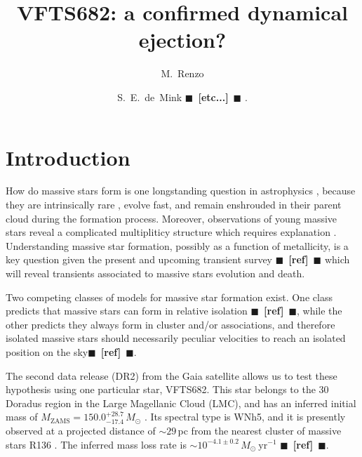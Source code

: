\documentclass{aa}
\newcommand{\todo}[1]{{\large $\blacksquare$~\textbf{\color{red}[#1]}}~$\blacksquare$}
\begin{document}
\title{VFTS682: a confirmed dynamical ejection?}

\author{M.~Renzo \and S.~E.~de~Mink \todo{etc...}%
  .} 

  
\date{}
\abstract{}

\maketitle{}

\section{Introduction}
\label{sec:intro}

How do massive stars form is one longstanding question in astrophysics
\citep[e.g.,][]{lada:03, zinnecker:07}, because they are intrinsically rare
\citep[e.g.,][]{salpeter:55,kroupa:01, schneider:18}, evolve fast, and
remain enshrouded in their parent cloud during the formation
process. Moreover, observations of young massive stars reveal a
complicated multipliticy structure which requires
explanation \citep[][]{sana:12,sana:17}. Understanding massive star formation, possibly as a
function of metallicity, is a key question given the present and upcoming
transient survey \citep[e.g., LSST, BlackGem, LIGO/Virgo O3][]{}\todo{ref} which
will reveal transients associated to massive stars
evolution and death.

Two competing classes of models for massive star formation exist. One class predicts 
that massive stars can form in relative isolation \todo{ref}, while the other predicts
they always form in cluster and/or associations, and therefore
isolated massive stars should necessarily peculiar velocities to reach
an isolated position on the sky\todo{ref}.

The second data release (DR2) from the Gaia satellite
\cite[][]{gaia:16,brown:18} allows us to test
these hypothesis using one particular star, VFTS682. 
This star belongs to the 30 Doradus region in the Large Magellanic
Cloud (LMC), and has an inferred initial mass of $M_\mathrm{ZAMS}=150.0^{+28.7}_{-17.4}\,M_\odot$
\citep[][]{bestenlehner:11,schneider:18}. Its spectral type is WNh5, and it is presently observed at a
projected distance of $\sim$$29$\,pc from the nearest cluster of
massive stars R136 \citep[also known as NGC2070][]{bestenlehner:11}. The inferred mass loss
rate is $\sim10^{-4.1\pm0.2}\,M_\odot \ \mathrm{yr}^{-1}$ \todo{ref}.
\end{document}
